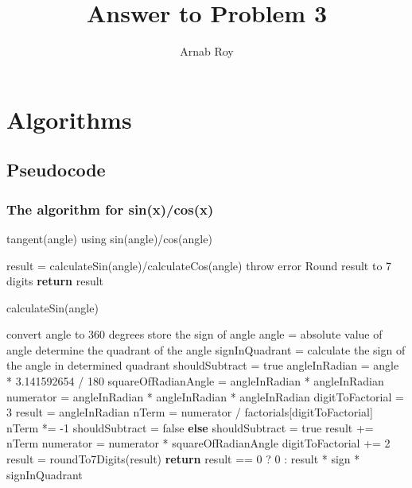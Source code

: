 \documentclass[12pt]{article}
\title{Answer to Problem 3}
\author{Arnab Roy}
\begin{document}
\maketitle

\section{Algorithms}
\subsection{Pseudocode}
\subsubsection{The algorithm for sin(x)/cos(x)}
\begin{algorithm}[H]
	\caption{tangent(angle) using sin(angle)/cos(angle)} 
	\begin{algorithmic}[1]
		\State result = calculateSin(angle)/calculateCos(angle)
		\State throw error
		\EndIf
		\State Round result to 7 digits
        \State \textbf{return} result
	\end{algorithmic} 
\end{algorithm}

\begin{algorithm}[H]
	\caption{calculateSin(angle)} 
	\begin{algorithmic}[1]
		\State convert angle to 360 degrees
		    \State store the sign of angle
		    \State angle = absolute value of angle
		\EndIf
		\State determine the quadrant of the angle
		\State signInQuadrant = calculate the sign of the angle in determined quadrant
		\State shouldSubtract = true
		\State angleInRadian = angle * 3.141592654 / 180
		\State squareOfRadianAngle = angleInRadian * angleInRadian
		\State numerator = angleInRadian * angleInRadian * angleInRadian
		\State digitToFactorial = 3
		\State result = angleInRadian
         \State nTerm = numerator / factorials[digitToFactorial]
            \State nTerm *= -1
            \State shouldSubtract = false
            \State \textbf{else}
            \State shouldSubtract = true
        \EndIf
        \State result += nTerm
        \State numerator = numerator * squareOfRadianAngle
        digitToFactorial += 2
        \EndFor
        \State result = roundTo7Digits(result)
        \State \textbf{return} result == 0 ? 0 : result * sign * signInQuadrant
	\end{algorithmic} 
\end{algorithm}
\end{document}
